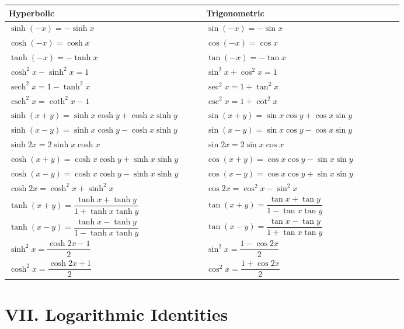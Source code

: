\documentclass[11pt, a4paper]{article}
\begin{document}
\begin{center}
\begin{tabular}{@{}p{0.45\linewidth} p{0.45\linewidth}@{}}
\toprule
\textbf{Hyperbolic} & \textbf{Trigonometric} \\
\midrule
$\sinh(-x) = -\sinh x$ & $\sin(-x) = -\sin x$ \\
$\cosh(-x) = \cosh x$ & $\cos(-x) = \cos x$ \\
$\tanh(-x) = -\tanh x$ & $\tan(-x) = -\tan x$ \\
\midrule
$\cosh^2 x - \sinh^2 x = 1$ & $\sin^2 x + \cos^2 x = 1$ \\
$\operatorname{sech}^2 x = 1 - \tanh^2 x$ & $\sec^2 x = 1 + \tan^2 x$ \\
$\operatorname{csch}^2 x = \coth^2 x - 1$ & $\csc^2 x = 1 + \cot^2 x$ \\
\midrule
$\sinh(x+y) = \sinh x\cosh y+\cosh x\sinh y$ & $\sin(x+y) = \sin x\cos y+\cos x\sin y$ \\
$\sinh(x-y) = \sinh x\cosh y-\cosh x\sinh y$ & $\sin(x-y) = \sin x\cos y-\cos x\sin y$ \\
$\sinh 2x = 2\sinh x\cosh x$ & $\sin 2x = 2\sin x\cos x$ \\
\midrule
$\cosh(x+y) = \cosh x\cosh y+\sinh x\sinh y$ & $\cos(x+y) = \cos x\cos y-\sin x\sin y$ \\
$\cosh(x-y) = \cosh x\cosh y-\sinh x\sinh y$ & $\cos(x-y) = \cos x\cos y+\sin x\sin y$ \\
$\cosh 2x = \cosh^2 x+\sinh^2 x$ & $\cos 2x = \cos^2 x-\sin^2 x$ \\
\midrule
$\tanh(x+y) = \dfrac{\tanh x+\tanh y}{1+\tanh x\tanh y}$ & $\tan(x+y) = \dfrac{\tan x+\tan y}{1-\tan x\tan y}$ \\[3mm]
$\tanh(x-y) = \dfrac{\tanh x-\tanh y}{1-\tanh x\tanh y}$ & $\tan(x-y) = \dfrac{\tan x-\tan y}{1+\tan x\tan y}$ \\[3mm]
\midrule
$\sinh^2 x = \dfrac{\cosh 2x - 1}{2}$ & $\sin^2 x = \dfrac{1-\cos 2x}{2}$ \\[2mm]
$\cosh^2 x = \dfrac{\cosh 2x + 1}{2}$ & $\cos^2 x = \dfrac{1+\cos 2x}{2}$ \\
\bottomrule
\end{tabular}
\end{center}

\section*{VII. Logarithmic Identities}
\end{document}

